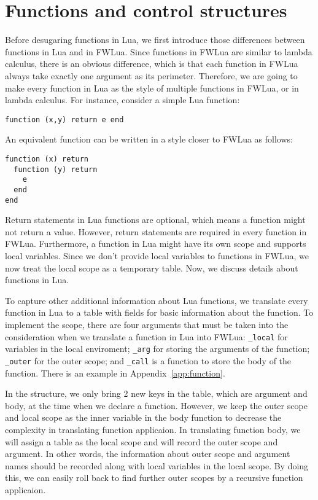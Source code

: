 \section{Functions and control structures}\label{sec:TraFunc}
Before desugaring functions in Lua, we first introduce those differences between functions in Lua and in FWLua. Since functions in FWLua are similar to lambda calculus, there is an obvious difference, which is that each function in FWLua always take exactly one argument as its perimeter. Therefore, we are going to make every function in Lua as the style of multiple functions in FWLua, or in lambda calculus. For instance, consider a simple Lua function:

\begin{verbatim}
function (x,y) return e end
\end{verbatim}

An equivalent function can be written in a style closer to FWLua as follows:

\begin{verbatim}
function (x) return 
  function (y) return 
    e
  end
end
\end{verbatim}

Return statements in Lua functions are optional, which means a function might not return a value. However, return statements are required in every function in FWLua.
Furthermore, a function in Lua might have its own scope and supports local variables. 
Since we don't provide local variables to functions in FWLua, we now treat the local scope as a temporary table.
Now, we discuss details about functions in Lua.

To capture other additional information about Lua functions,
we translate every function in Lua to a table with fields for basic information about the function. To implement the scope, there are four arguments that must be taken into the consideration when we translate a function in Lua into FWLua: {\tt \_local} for variables in the local enviroment; {\tt \_arg} for storing the arguments of the function; {\tt \_outer} for the  outer scope; and {\tt \_call} is a function to store the body of the function. There is an example in Appendix~\ref{app:function}.

In the structure, we only bring 2 new keys in the table, which are argument and body, at the time when we declare a function. However, we keep the outer scope and local scope as the inner variable in the body function to decrease the complexity in translating function applicaion. In translating function body, we will assign a table as the local scope and will record the outer scope and argument. In other words, the information about outer scope and argument names should be recorded along with local variables in the local scope. By doing this, we can easily roll back to find further outer scopes by a recursive function applicaion.

